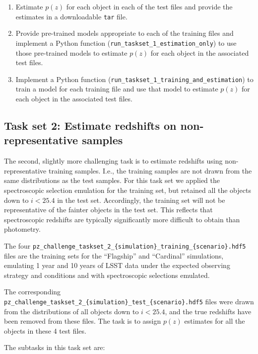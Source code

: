 \documentclass[11pt,twoside,letterpaper,onecolumn,english]{article}
\begin{document}
\begin{enumerate}
  \item{Estimate $p(z)$ for each object in each of the test files and
      provide the estimates in a downloadable \texttt{tar} file.}
  \item{Provide pre-trained models appropriate to each of the training
      files and implement a Python function (\texttt{run\_taskset\_1\_estimation\_only}) to use those
      pre-trained models to estimate $p(z)$ for each object in the
      associated test files.}    
  \item{Implement a Python function (\texttt{run\_taskset\_1\_training\_and\_estimation}) to train a model for
      each training file and use that model to estimate $p(z)$ for
      each object in the associated test files.}    
\end{enumerate}


\subsection{Task set 2: Estimate redshifts on non-representative
  samples}

The second, slightly more challenging task is to estimate redshifts
using non-representative training samples. I.e., the training samples
are not drawn from the same distributions as the test samples. For this task set we
applied the spectroscopic selection emulation for the training set, but
retained all the objects down to $i < 25.4$ in the test set.
Accordingly, the training set will not be representative of the
fainter objects in the test set. This reflects that spectroscopic redshifts
are typically significantly more difficult to obtain than photometry.

The four 
\texttt{pz\_challenge\_taskset\_2\_\{simulation\}\_training\_\{scenario\}.hdf5}
files are the training sets for the ``Flagship'' and ``Cardinal''
simulations, emulating 1 year and 10 years of LSST data under the
expected observing strategy and conditions and with spectroscopic
selections emulated.

The corresponding 
\texttt{pz\_challenge\_taskset\_2\_\{simulation\}\_test\_\{scenario\}.hdf5}
files were \allowbreak  drawn from the distributions of all objects down to $i <
25.4$, and the true redshifts have been removed from these files. 
The task is to assign $p(z)$ estimates for all the objects in these 4 test files.

The subtasks in this task set are:
\end{document}
